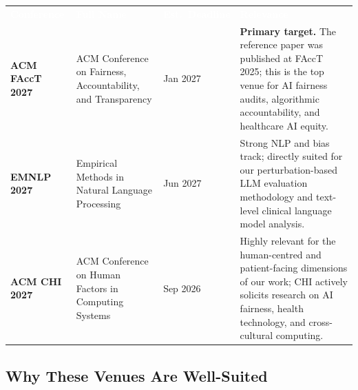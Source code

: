 \documentclass[12pt, a4paper]{article}
\begin{document}
\begin{center}
\renewcommand{\arraystretch}{1.6}
\begin{tabularx}{0.95\linewidth}{>{\bfseries\small}p{3.0cm} >{\small}p{3.2cm} >{\small}p{2.2cm} >{\small}X}
\rowcolor{rowblue}
\textcolor{white}{\textbf{Conference}} & \textcolor{white}{\textbf{Full Name}} & \textcolor{white}{\textbf{Est.\ Deadline}} & \textcolor{white}{\textbf{Relevance}} \\
\rowcolor{rowalt}
ACM FAccT 2027 & ACM Conference on Fairness, Accountability, and Transparency & Jan 2027 & \textbf{Primary target.} The reference paper was published at FAccT 2025; this is the top venue for AI fairness audits, algorithmic accountability, and healthcare AI equity. \\
EMNLP 2027 & Empirical Methods in Natural Language Processing & Jun 2027 & Strong NLP and bias track; directly suited for our perturbation-based LLM evaluation methodology and text-level clinical language model analysis. \\
\rowcolor{rowalt}
ACM CHI 2027 & ACM Conference on Human Factors in Computing Systems & Sep 2026 & Highly relevant for the human-centred and patient-facing dimensions of our work; CHI actively solicits research on AI fairness, health technology, and cross-cultural computing. \\
\end{tabularx}
\end{center}

\subsection{Why These Venues Are Well-Suited}
\end{document}
